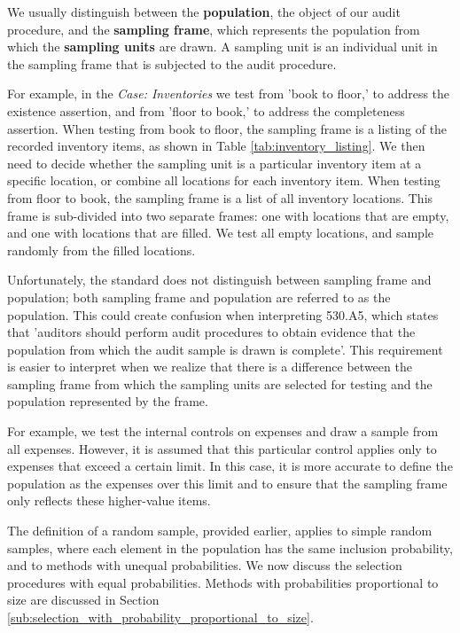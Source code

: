 \bigskip
We usually distinguish between the \textbf{population}, the object of our audit procedure, and the \textbf{sampling frame}, which represents the population from which the \textbf{sampling units} are drawn. A sampling unit is an individual unit in the sampling frame that is subjected to the audit procedure. 

For example, in the \emph{Case: Inventories} we test from 'book to floor,' to address the existence assertion, and from 'floor to book,' to address the completeness assertion. When testing from book to floor, the sampling frame is a listing of the recorded inventory items, as shown in Table \ref{tab:inventory_listing}. We then need to decide whether the sampling unit is a particular inventory item at a specific location, or combine all locations for each inventory item. When testing from floor to book, the sampling frame is a list of all inventory locations. This frame is sub-divided into two separate frames: one with locations that are empty, and one with locations that are filled. We test all empty locations, and sample randomly from the filled locations.

\bigskip 
Unfortunately, the standard does not distinguish between sampling frame and population; both sampling frame and population are referred to as the population. This could create confusion when interpreting 530.A5, which states that 'auditors should perform audit procedures to obtain evidence that the population from which the audit sample is drawn is complete'. This requirement is easier to interpret when we realize that there is a difference between the sampling frame from which the sampling units are selected for testing and the population represented by the frame. 

For example, we test the internal controls on expenses and draw a sample from all expenses. However, it is assumed that this particular control applies only to expenses that exceed a certain limit. In this case, it is more accurate to define the population as the expenses over this limit and to ensure that the sampling frame only reflects these higher-value items.

The definition of a random sample, provided earlier, applies to simple random samples, where each element in the population has the same inclusion probability, and to methods with unequal probabilities. We now discuss the selection procedures with equal probabilities. Methods with probabilities proportional to size are discussed in Section \ref{sub:selection_with_probability_proportional_to_size}.

